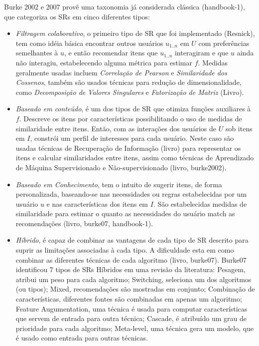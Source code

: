 \documentclass[normaltoc, espacoumemeio, pnumromarab,ruledheader]{abnt}
\begin{document}
Burke 2002 e 2007 provê uma taxonomia já considerada clássica (handbook-1), que categoriza os SRs em cinco diferentes tipos:
\begin{itemize}
 \item \textit{Filtragem colaborativo}, o primeiro tipo de SR que foi implementado (Resnick), tem como idéia básica encontrar outros usuários $u_{1..n}$ em $U$ com preferências semelhantes à $u$, e então recomendar itens que $u_{1..n}$ interagiram e que $u$ ainda não interagiu, estabelecendo alguma métrica para estimar $f$. Medidas geralmente usadas incluem \textit{Correlação de Pearson} e \textit{Similaridade dos Cossenos}, também são usados técnicas para redução de dimensionalidade, como \textit{Decomposição de Valores Singulares} e \textit{Fatorização de Matriz} (Livro).
 \item \textit{Baseado em conteúdo}, é um dos tipos de SR que otimiza funções auxiliares à $f$. Descreve os itens por características possibilitando o uso de medidas de similaridade entre itens. Então, com as interações dos usuários de $U$ sob itens em $I$, constrói um perfil de interesses para cada usuário. Neste caso são usadas técnicas de Recuperação de Informação (livro) para representar os itens e calcular similaridades entre itens, assim como técnicas de Aprendizado de Máquina Supervisionado e Não-supervisionado (livro, burke2002).
 \item \textit{Baseado em Conhecimento}, tem o intuito de sugerir itens, de forma personalizada, baseando-se nas necessidades ou regras estabelecidas por um usuário $u$ e nas características dos itens em $I$. São estabelecidas medidas de similaridade para estimar o quanto as necessidades do usuário match as recomendações (livro, burke07, handbook-1).
 \item \textit{Híbrido}, é capaz de combinar as vantagens de cada tipo de SR descrito para suprir as limitações associadas à cada tipo. A dificuldade esta em como combinar as diferentes técnicas de cada algoritmo (livro, burke07). Burke07 identificou 7 tipos de SRs Híbridos em uma revisão da literatura: Pesagem, atribui um peso para cada algoritmo; Switching, seleciona um dos algoritmos (ou tipos); Mixed, recomendações são mostradas em conjunto; Combinação de características, diferentes fontes são combinadas em apenas um algoritmo; Feature Augumentation, uma técnica é usada para computar características que servem de entrada para outra técnica; Cascade, é atribuído um grau de prioridade para cada algoritmo; Meta-level, uma técnica gera um modelo, que é usado como entrada para outras técnicas.
\end{itemize}
\end{document}
